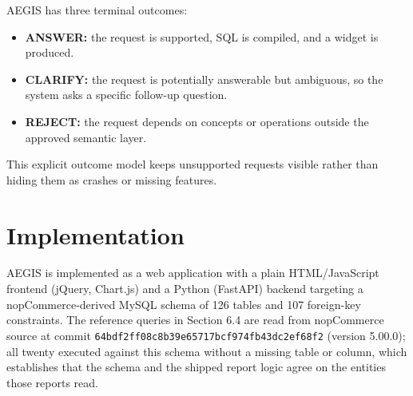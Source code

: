 \documentclass[pdflatex,sn-mathphys-num]{sn-jnl}
\begin{document}
AEGIS has three terminal outcomes:


\begin{itemize}
\item \textbf{ANSWER:} the request is supported, SQL is compiled, and a widget is produced.
\item \textbf{CLARIFY:} the request is potentially answerable but ambiguous, so the system asks a specific follow-up question.
\item \textbf{REJECT:} the request depends on concepts or operations outside the approved semantic layer.
\end{itemize}

This explicit outcome model keeps unsupported requests visible rather than hiding them as crashes or missing features.


\section{Implementation}

AEGIS is implemented as a web application with a plain HTML/JavaScript frontend (jQuery, Chart.js) and a Python (FastAPI) backend targeting a nopCommerce-derived MySQL schema of 126 tables and 107 foreign-key constraints. The reference queries in Section 6.4 are read from nopCommerce source at commit \texttt{64bdf2ff08c8b39e65717bcf974fb43dc2ef68f2} (version 5.00.0); all twenty executed against this schema without a missing table or column, which establishes that the schema and the shipped report logic agree on the entities those reports read.
\end{document}
